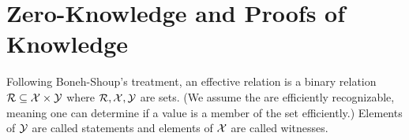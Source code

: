 \section{Zero-Knowledge and Proofs of Knowledge}
\label{sec:idprots}


Following Boneh-Shoup's treatment, 
an effective relation is a binary relation ${\cal R} \subseteq {\cal X} \times {\cal Y}$
where ${\cal R}, {\cal X},{\cal Y}$ are sets. (We assume the are efficiently
recognizable, meaning one can determine if a value is a member of the set
efficiently.) Elements of ${\cal Y}$ are called statements and elements of ${\cal X}$
are called witnesses.




